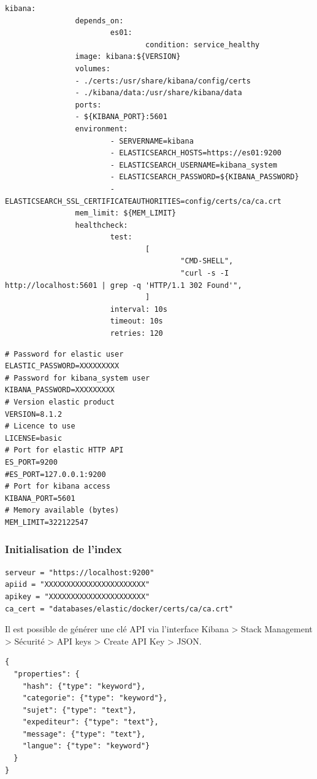 \documentclass[a4paper,12pt]{article}
\begin{document}
\begin{lstlisting}[title=DockerCompose]
        kibana:
                depends_on:
                        es01:
                                condition: service_healthy
                image: kibana:${VERSION}
                volumes:
                - ./certs:/usr/share/kibana/config/certs
                - ./kibana/data:/usr/share/kibana/data
                ports:
                - ${KIBANA_PORT}:5601
                environment:
                        - SERVERNAME=kibana
                        - ELASTICSEARCH_HOSTS=https://es01:9200
                        - ELASTICSEARCH_USERNAME=kibana_system
                        - ELASTICSEARCH_PASSWORD=${KIBANA_PASSWORD}
                        - ELASTICSEARCH_SSL_CERTIFICATEAUTHORITIES=config/certs/ca/ca.crt
                mem_limit: ${MEM_LIMIT}
                healthcheck:
                        test:
                                [
                                        "CMD-SHELL",
                                        "curl -s -I http://localhost:5601 | grep -q 'HTTP/1.1 302 Found'",
                                ]
                        interval: 10s
                        timeout: 10s
                        retries: 120
			\end{lstlisting}
			
			\begin{lstlisting}[title=Fichier d'environnement]
# Password for elastic user
ELASTIC_PASSWORD=XXXXXXXXX
# Password for kibana_system user
KIBANA_PASSWORD=XXXXXXXXX
# Version elastic product
VERSION=8.1.2
# Licence to use
LICENSE=basic
# Port for elastic HTTP API
ES_PORT=9200
#ES_PORT=127.0.0.1:9200
# Port for kibana access
KIBANA_PORT=5601
# Memory available (bytes)
MEM_LIMIT=322122547
			\end{lstlisting}

		\subsubsection{Initialisation de l'index}
		
			\begin{lstlisting}[title=Exemples de secrets]
serveur = "https://localhost:9200"
apiid = "XXXXXXXXXXXXXXXXXXXXXXX"
apikey = "XXXXXXXXXXXXXXXXXXXXXX"
ca_cert = "databases/elastic/docker/certs/ca/ca.crt"
			\end{lstlisting}
			Il est possible de générer une clé API via l'interface Kibana > Stack Management > Sécurité > API keys > Create API Key > JSON. 
			
			\begin{lstlisting}[title=Mapping de l'index]
{
  "properties": {
    "hash": {"type": "keyword"},
    "categorie": {"type": "keyword"},
    "sujet": {"type": "text"},
    "expediteur": {"type": "text"},
    "message": {"type": "text"},
    "langue": {"type": "keyword"}
  }
}
			\end{lstlisting}
			
\end{document}
